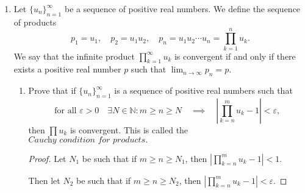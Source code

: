 \documentclass{article}
\begin{document}
\begin{enumerate}
\begin{enumerate}
\begin{proof}
            And $|\alpha_n-a|<\varepsilon$ as desired.
        \end{proof}
    \item Show an example (no need for proof) that the converse is not true. That is, provide a sequence $\{a_n\}$ such that $\{\alpha_n\}$ converges, but $\{a_n\}$ diverges.
        
        \paragraph{Solution: }Take the sequence $\{(-1)^n\} _{n=1}^{\infty}$, which does not converge ($\liminf a_n=-1\neq 1=\limsup a_n$. Then our sum becomes $\sum_{k=1}^{\infty} \frac{(-1)^n}{k}$. We know this to be the alternating harmonic series, a convergent series.

\end{enumerate}
\newpage

\item Let $\{u_{n}\}_{n=1}^{\infty}$ be a sequence of positive real numbers. We define the sequence of products 
\[p_1=u_1,\quad p_2=u_1u_2,\quad p_n=u_1u_2\cdots u_n=\prod_{k=1}^nu_k.\]
We say that the infinite product $\prod_{k=1}^{\infty}u_k$ is convergent if and only if there exists a positive
real number $p$ such that $\lim_{n\to\infty}p_n=p.$

\begin{enumerate}
    \item Prove that if $\{u_n\}_{n=1}^\infty$ is a sequence of positive real numbers such that
$$\text{for all }\varepsilon>0\quad\exists N\in\mathbb{N}:m\ge n\ge N\quad\implies\quad\left|\prod_{k=n}^mu_k-1\right|<\varepsilon,$$
then $\prod u_k$ is convergent. This is called the $\textit{Cauchy condition for products}.$

\begin{proof} 
    
    Let $N_1$ be such that if $m\geq n\geq N_1$, then $\left|\prod_{k=n}^mu_k-1\right|<1$.

    Then let $N_2$ be such that if $m\geq n\geq N_2$, then $\left|\prod_{k=n}^mu_k-1\right|<\varepsilon$.


\end{proof}
\end{enumerate}
\end{enumerate}
\end{document}
